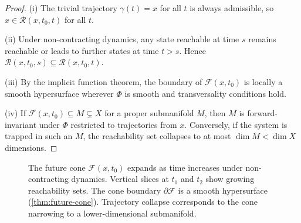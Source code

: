 \documentclass[12pt,twoside,openright]{book}
\newcommand{\reach}{\mathcal{R}}
\begin{document}
\begin{proof}
  (i) The trivial trajectory $\gamma(t)=x$ for all $t$ is
  always admissible, so $x\in\reach(x,t_0,t)$ for all $t$.

  (ii) Under non-contracting dynamics, any state reachable
  at time $s$ remains reachable or leads to further states
  at time $t>s$. Hence
  $\reach(x,t_0,s)\subseteq\reach(x,t_0,t)$.

  (iii) By the implicit function theorem, the boundary of
  $\mathcal{F}(x,t_0)$ is locally a smooth hypersurface
  wherever $\Phi$ is smooth and transversality conditions
  hold.

  (iv) If $\mathcal{F}(x,t_0)\subseteq M \subsetneq X$ for a
  proper submanifold $M$, then $M$ is forward-invariant
  under $\Phi$ restricted to trajectories from $x$.
  Conversely, if the system is trapped in such an $M$, the
  reachability set collapses to at most $\dim M < \dim X$
  dimensions.
\end{proof}

\begin{figure}[h]
\centering
{}
\caption{The future cone $\mathcal{F}(x,t_0)$ expands as time
  increases under non-contracting dynamics. Vertical slices
  at $t_1$ and $t_2$ show growing reachability sets. The cone
  boundary $\partial\mathcal{F}$ is a smooth hypersurface
  (\cref{thm:future-cone}). Trajectory collapse corresponds
  to the cone narrowing to a lower-dimensional
  submanifold.}
\label{fig:future-cone}
\end{figure}
\end{document}
